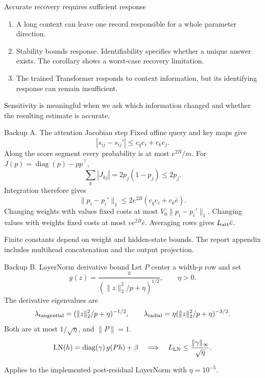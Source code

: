 \documentclass[aspectratio=169,11pt]{beamer}
\newcommand{\source}[1]{\par\vfill{\color{muted}\tiny #1}}
\begin{document}
\begin{frame}{Accurate recovery requires sufficient response}
\begin{enumerate}
\setlength{\itemsep}{5mm}
\item A long context can leave one record responsible for a whole parameter direction.
\item Stability bounds response. Identifiability specifies whether a unique answer exists.
The corollary shows a worst-case recovery limitation.
\item The trained Transformer responds to context information,
but its identifying response can remain insufficient.
\end{enumerate}
\vspace{6mm}
{\color{teal}\large Sensitivity is meaningful when we ask which information changed
and whether the resulting estimate is accurate.}
\end{frame}

\appendix
{}

\begin{frame}[noframenumbering]{Backup A. The attention Jacobian step}
\small
Fixed affine query and key maps give
\[
|s_{ij}-s_{ij}'|\le c_q e_i+c_k e_j.
\]
Along the score segment every probability is at most \(e^{2B}/m\).
For \(J(p)=\operatorname{diag}(p)-pp^\top\),
\[
\sum_k|J_{kj}|=2p_j(1-p_j)\le2p_j.
\]
Integration therefore gives
\[
\|p_i-p_i'\|_1\le2e^{2B}(c_qe_i+c_k\bar e).
\]
Changing weights with values fixed costs at most \(V_0\|p_i-p_i'\|_1\).
Changing values with weights fixed costs at most \(ve^{2B}\bar e\).
Averaging rows gives \(L_{\rm att}\bar e\).
\source{Finite constants depend on weight and hidden-state bounds.
The report appendix includes multihead concatenation and the output projection.}
\end{frame}
\begin{frame}[noframenumbering]{Backup B. LayerNorm derivative bound}
\small
Let \(P\) center a width-\(p\) row and set
\[
g(z)=\frac{z}{(\|z\|_2^2/p+\eta)^{1/2}},\qquad \eta>0.
\]
The derivative eigenvalues are
\[
\lambda_{\rm tangential}
 =(\|z\|_2^2/p+\eta)^{-1/2},
\qquad
\lambda_{\rm radial}
 =\eta(\|z\|_2^2/p+\eta)^{-3/2}.
\]
Both are at most \(1/\sqrt{\eta}\), and \(\|P\|=1\).
\[
\mathrm{LN}(h)=\operatorname{diag}(\gamma)\,g(Ph)+\beta
\quad\Longrightarrow\quad
L_{\rm LN}\le\frac{\|\gamma\|_\infty}{\sqrt{\eta}}.
\]
\source{Applies to the implemented post-residual LayerNorm with \(\eta=10^{-5}\).}
\end{frame}
\end{document}
